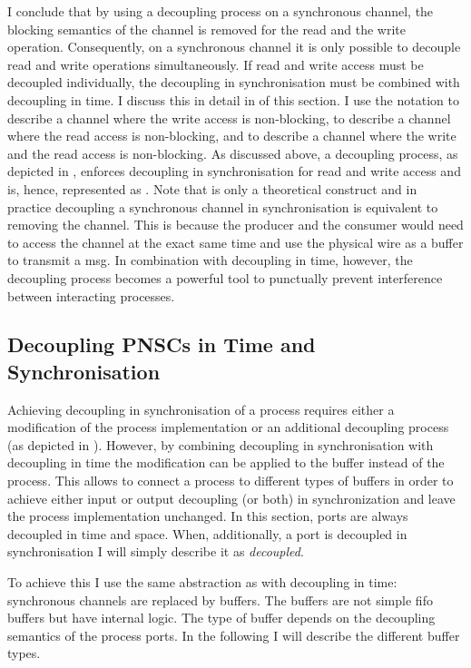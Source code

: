 I conclude that by using a decoupling process on a synchronous channel, the blocking semantics of the channel is removed for the read and the write operation.
Consequently, on a synchronous channel it is only possible to decouple read and write operations simultaneously.
If read and write access must be decoupled individually, the decoupling in synchronisation must be combined with decoupling in time.
I discuss this in detail in \SSect{\ref{sect_cci_decoupling_all}} of this section.
I use the notation \channel{)->}{} to describe a channel where the write access is non-blocking, \channel{->>}{} to describe a channel where the read access is non-blocking, and \channel{)->>}{} to describe a channel where the write and the read access is non-blocking.
As discussed above, a decoupling process, as depicted in \Fig{\ref{fig_sia_decoupler}}, enforces decoupling in synchronisation for read and write access and is, hence, represented as \channel{)->>}{}.
Note that \channel{)->>}{} is only a theoretical construct and in practice decoupling a synchronous channel in synchronisation is equivalent to removing the channel.
This is because the producer and the consumer would need to access the channel at the exact same time and use the physical wire as a buffer to transmit a \gls*{msg}.
In combination with decoupling in time, however, the decoupling process becomes a powerful tool to punctually prevent interference between interacting processes.


\subsection{Decoupling PNSCs in Time and Synchronisation}
\label{sect_cci_decoupling_all}
Achieving decoupling in synchronisation of a process requires either a modification of the process implementation or an additional decoupling process (as depicted in \Fig{\ref{fig_sia_decoupler}}).
However, by combining decoupling in synchronisation with decoupling in time the modification can be applied to the buffer instead of the process.
This allows to connect a process to different types of buffers in order to achieve either input or output decoupling (or both) in synchronization and leave the process implementation unchanged.
In this section, ports are always decoupled in time and space.
When, additionally, a port is decoupled in synchronisation I will simply describe it as \emph{decoupled}.

To achieve this I use the same abstraction as with decoupling in time: synchronous channels are replaced by buffers.
The buffers are not simple \gls{fifo} buffers but have internal logic.
The type of buffer depends on the decoupling semantics of the process ports.
In the following I will describe the different buffer types.

